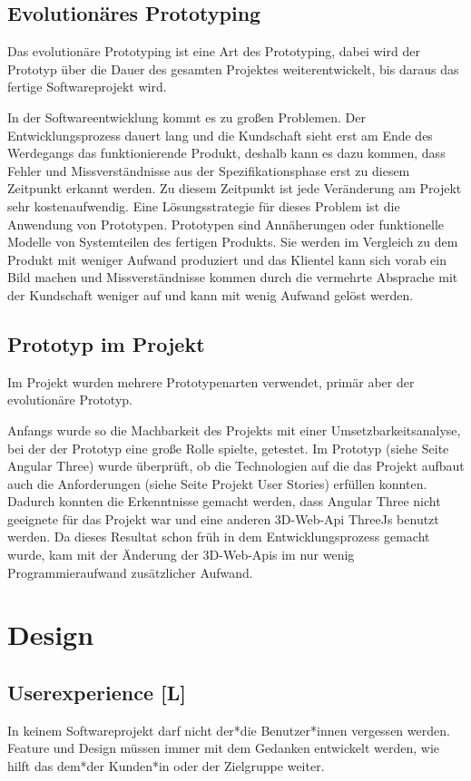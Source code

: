 \subsection{Evolutionäres Prototyping}
\label{ch::ongoing-prototyping}
Das evolutionäre Prototyping ist eine Art des Prototyping, dabei wird der Prototyp über die Dauer des gesamten Projektes weiterentwickelt, bis daraus das fertige Softwareprojekt wird.

In der Softwareentwicklung kommt es zu großen Problemen. Der Entwicklungsprozess dauert lang und die Kundschaft sieht erst am Ende des Werdegangs das funktionierende Produkt, deshalb kann es dazu kommen, dass Fehler und Missverständnisse aus der Spezifikationsphase erst zu diesem Zeitpunkt erkannt werden. Zu diesem Zeitpunkt ist jede Veränderung am Projekt sehr kostenaufwendig. Eine Lösungsstrategie für dieses Problem ist die Anwendung von Prototypen. Prototypen sind Annäherungen oder funktionelle Modelle von Systemteilen des fertigen Produkts. Sie werden im Vergleich zu dem Produkt mit weniger Aufwand produziert und das Klientel kann sich vorab ein Bild machen und Missverständnisse kommen durch die vermehrte Absprache mit der Kundschaft weniger auf und kann mit wenig Aufwand gelöst werden. \cite{Prototyping}

\subsection{Prototyp im Projekt}
Im Projekt wurden mehrere Prototypenarten verwendet, primär aber der evolutionäre Prototyp.

Anfangs wurde so die Machbarkeit des Projekts mit einer Umsetzbarkeitsanalyse, bei der der Prototyp eine große Rolle spielte, getestet. Im Prototyp (siehe Seite \pageref{ch:Technologien:AngularThree} Angular Three) wurde überprüft, ob die Technologien auf die das Projekt aufbaut auch die Anforderungen (siehe Seite \pageref{ch:umsetzung:projekt-user-stories} Projekt User Stories) erfüllen konnten. Dadurch konnten die Erkenntnisse gemacht werden, dass Angular Three nicht geeignete für das Projekt war und eine anderen 3D-Web-Api ThreeJs benutzt werden. Da dieses Resultat schon früh in dem Entwicklungsprozess gemacht wurde, kam mit der Änderung der 3D-Web-Apis im nur wenig Programmieraufwand zusätzlicher Aufwand.

\section{Design}
\subsection{Userexperience [L]}
In keinem Softwareprojekt darf nicht der*die Benutzer*innen vergessen werden. Feature und Design müssen immer mit dem Gedanken entwickelt werden, wie hilft das dem*der Kunden*in oder der Zielgruppe weiter.


